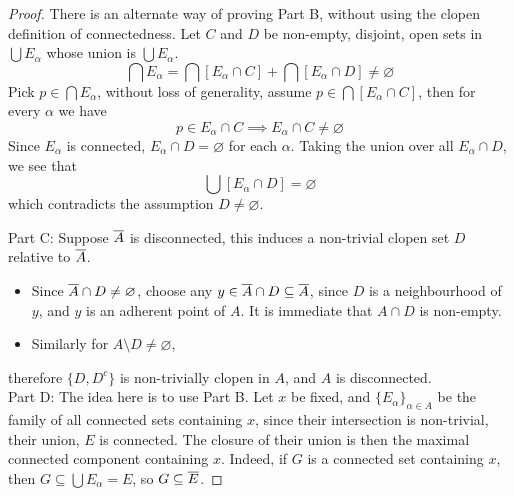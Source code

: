 \documentclass[../../main.tex]{subfiles}
\begin{document}
\begin{proof}
    There is an alternate way of proving Part B, without using the clopen definition of connectedness. Let $C$ and $D$ be non-empty, disjoint, open sets in $\bigcup E_\alpha$ whose union is $\bigcup E_\alpha$. 
    \[
        \bigcap E_\alpha = \bigcap [E_\alpha\cap C] + \bigcap[E_\alpha\cap D]\neq\varnothing
    \]
    Pick $p\in\bigcap E_\alpha$, without loss of generality, assume $p\in\bigcap [E_\alpha\cap C]$, then for every $\alpha$ we have
    \[
        p\in E_\alpha\cap C\implies E_\alpha\cap C\neq\varnothing
    \]
    Since $E_\alpha$ is connected, $E_\alpha\cap D=\varnothing$ for each $\alpha$. Taking the union over all $E_\alpha\cap D$, we see that
    \[
        \bigcup [E_\alpha\cap D] = \varnothing
    \]
    which contradicts the assumption $D\neq\varnothing$.

    Part C: Suppose $\overline{A}$ is disconnected, this induces a non-trivial clopen set $D$ relative to $\overline{A}$. 
    \begin{itemize}
        \item Since $\overline{A}\cap D\neq\varnothing$, choose any $y\in\overline{A}\cap D\subseteq \overline{A}$, since $D$ is a neighbourhood of $y$, and $y$ is an adherent point of $A$. It is immediate that $A\cap D$ is non-empty.
        \item Similarly for $A\setminus D\neq\varnothing$,
    \end{itemize}
    therefore $\{D,D^c\}$ is non-trivially clopen in $A$, and $A$ is disconnected.\\

    Part D: The idea here is to use Part B. Let $x$ be fixed, and $\{E_\alpha\}_{\alpha\in A}$ be the family of all connected sets containing $x$, since their intersection is non-trivial, their union, $E$ is connected. The closure of their union is then the maximal connected component containing $x$. Indeed, if $G$ is a connected set containing $x$, then $G\subseteq \bigcup E_\alpha = E$, so $G\subseteq \overline{E}$.
\end{proof}
\newpage
\end{document}
